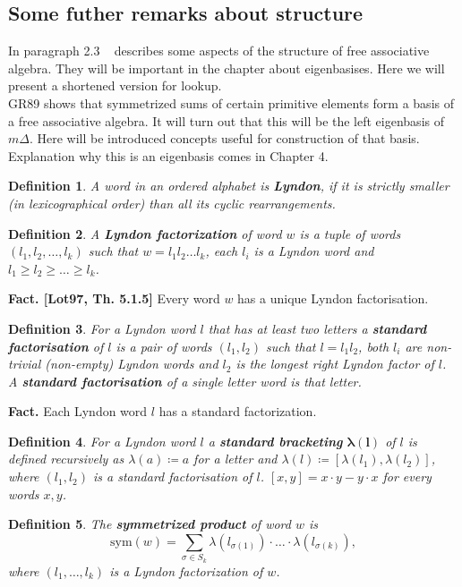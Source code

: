 \documentclass[a4paper, 12pt]{report}
\newtheorem{definition}{Definition}
\begin{document}
\subsection{Some futher remarks about structure}
In paragraph 2.3 ~\cite{Diaconis2014} describes some aspects of the structure of free associative algebra.
They will be important in the chapter about eigenbasises. Here we will present a shortened version for
 lookup.
 \\
GR89 shows that symmetrized sums of certain primitive elements form a basis of a free associative algebra.
It will turn out that this will be the left eigenbasis of $m\Delta$.
Here will be introduced concepts useful for
construction of that basis. Explanation why this is an eigenbasis comes in Chapter 4.
\begin{definition}
A word in an ordered alphabet is \textbf{Lyndon}, if it is strictly smaller (in lexicographical order)
 than all its cyclic rearrangements.
\end{definition}
\begin{definition}
A \textbf{Lyndon factorization} of word $w$ is a tuple of words $(l_1, l_2, \dots, l_k)$ such that
$w = l_1l_2\dots l_k$, each $l_i$ is a Lyndon word and $l_1 \geq l_2 \geq \dots \geq l_k$.
\end{definition}
\noindent\textbf{Fact. [Lot97, Th. 5.1.5]} Every word $w$ has a unique Lyndon factorisation.
\begin{definition}
For a Lyndon word $l$ that has at least two letters a \textbf{standard factorisation} of $l$ is a pair of
words $(l_1, l_2)$ such that $l = l_1l_2$, both $l_i$ are non-trivial (non-empty) Lyndon words and $l_2$
is the longest right Lyndon factor of $l$. A \textbf{standard factorisation} of a single letter word is that
letter.
\end{definition}
\noindent\textbf{Fact.} Each Lyndon word $l$ has a standard factorization.
\begin{definition}
For a Lyndon word $l$ a \textbf{standard bracketing} $\boldsymbol{\lambda(l)}$ of $l$ is defined recursively
as
$\lambda(a) \coloneqq a$ for a letter and $\lambda(l) \coloneqq [\lambda(l_1), \lambda(l_2)]$, where $(l_1,
l_2)$
is a standard factorisation of $l$. $[x, y] = x\cdot y - y\cdot x$ for every words $x, y$.
\end{definition}
\begin{definition}
The \textbf{symmetrized product} of word $w$ is
\begin{equation*}
\mathrm{sym}(w) = \sum_{\sigma \in S_k} \lambda(l_{\sigma(1)})\cdot\ldots\cdot\lambda(l_{\sigma(k)}),
\end{equation*}
where $(l_1, \dots, l_k)$ is a Lyndon factorization of $w$.
\end{definition}
\end{document}
